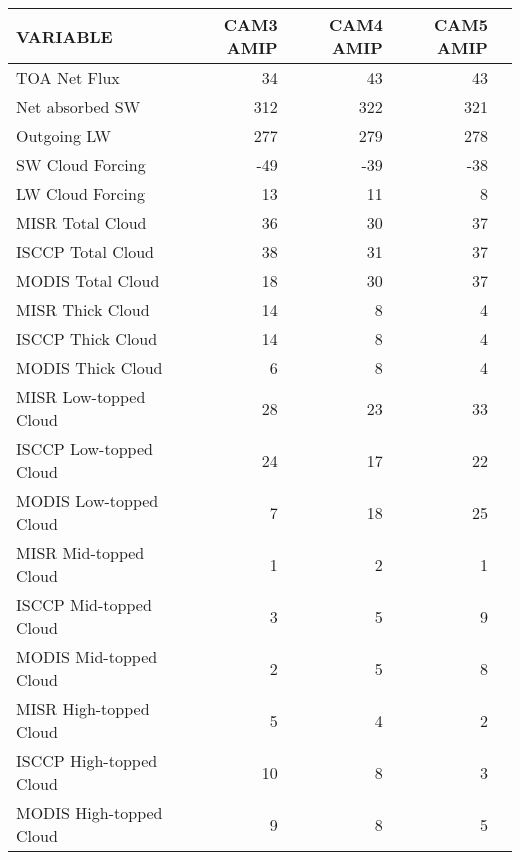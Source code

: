 \begin{tabular}{lrrrr}
\hline
                VARIABLE &                CAM3 AMIP &                CAM4 AMIP &                CAM5 AMIP \\ \hline
            TOA Net Flux &                       34 &                       43 &                       43 \\
         Net absorbed SW &                      312 &                      322 &                      321 \\
             Outgoing LW &                      277 &                      279 &                      278 \\
        SW Cloud Forcing &                      -49 &                      -39 &                      -38 \\
        LW Cloud Forcing &                       13 &                       11 &                        8 \\
        MISR Total Cloud &                       36 &                       30 &                       37 \\
       ISCCP Total Cloud &                       38 &                       31 &                       37 \\
       MODIS Total Cloud &                       18 &                       30 &                       37 \\
        MISR Thick Cloud &                       14 &                        8 &                        4 \\
       ISCCP Thick Cloud &                       14 &                        8 &                        4 \\
       MODIS Thick Cloud &                        6 &                        8 &                        4 \\
   MISR Low-topped Cloud &                       28 &                       23 &                       33 \\
  ISCCP Low-topped Cloud &                       24 &                       17 &                       22 \\
  MODIS Low-topped Cloud &                        7 &                       18 &                       25 \\
   MISR Mid-topped Cloud &                        1 &                        2 &                        1 \\
  ISCCP Mid-topped Cloud &                        3 &                        5 &                        9 \\
  MODIS Mid-topped Cloud &                        2 &                        5 &                        8 \\
  MISR High-topped Cloud &                        5 &                        4 &                        2 \\
 ISCCP High-topped Cloud &                       10 &                        8 &                        3 \\
 MODIS High-topped Cloud &                        9 &                        8 &                        5 \\ \hline
\end{tabular}
